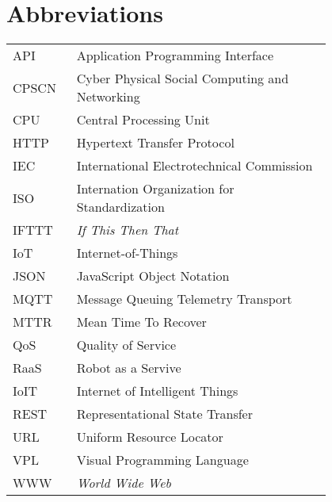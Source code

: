 \chapter*{Abbreviations}


\begin{flushleft}
\begin{tabular}{l p{0.8\linewidth}}
API      & Application Programming Interface\\
CPSCN    & Cyber Physical Social Computing and Networking\\
CPU      & Central Processing Unit\\
HTTP     & Hypertext Transfer Protocol\\
IEC      & International Electrotechnical Commission\\
ISO      & Internation Organization for Standardization\\
IFTTT    & \textit{If This Then That}\\
IoT      & Internet-of-Things\\
JSON     & JavaScript Object Notation\\
MQTT     & Message Queuing Telemetry Transport\\
MTTR     & Mean Time To Recover\\
QoS      & Quality of Service\\
RaaS     & Robot as a Servive\\
IoIT     & Internet of Intelligent Things\\
REST     & Representational State Transfer\\
URL      & Uniform Resource Locator\\
VPL      & Visual Programming Language\\
WWW      & \textit{World Wide Web}\\
\end{tabular}
\end{flushleft}

